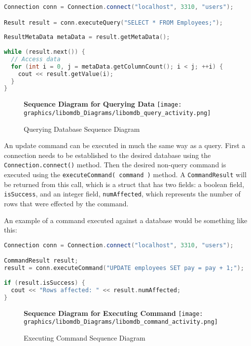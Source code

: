 \documentclass[letterpaper, 12pt]{article}
\renewcommand{\includegraphics}[2][]{\fbox{}}
\begin{document}
  \begin{lstlisting}[language=C++]
Connection conn = Connection.connect("localhost", 3310, "users"); 

Result result = conn.executeQuery("SELECT * FROM Employees;");
		
ResultMetaData metaData = result.getMetaData();	
	
while (result.next()) {
  // Access data
  for (int i = 0, j = metaData.getColumnCount(); i < j; ++i) {
    cout << result.getValue(i);	  	
  }
}
  \end{lstlisting}
  \par\vspace{\baselineskip}
  
  \begin{figure}
    \centering
    \textbf{Sequence Diagram for Querying Data}
    \texttt{[image: graphics/libomdb\_Diagrams/libomdb\_query\_activity.png]}
    \caption{Querying Database Sequence Diagram}
  \end{figure}
  \par\vspace{\baselineskip}
    
  An update command can be executed in much the same way as a query. First 
  a connection needs to be established to the desired database using the 
  \lstinline[basicstyle=\ttfamily]|Connection.connect()|
  method. Then the desired non-query command is executed using the 
  \lstinline[basicstyle=\ttfamily]|executeCommand( command )| method.
  A \lstinline[basicstyle=\ttfamily]|CommandResult| will be returned from this call,
  which is a struct that has two fields: a boolean field,
  \lstinline[basicstyle=\ttfamily]|isSuccess|, and an integer field,
  \lstinline[basicstyle=\ttfamily]|numAffected|, which represents the number of rows 
  that were effected by the command.
  \par\vspace{\baselineskip}
  An example of a command executed against a database would be something like this:
  \begin{lstlisting}[language=C++]
Connection conn = Connection.connect("localhost", 3310, "users");

CommandResult result;
result = conn.executeCommand("UPDATE employees SET pay = pay + 1;");
	
if (result.isSuccess) {
  cout << "Rows affected: " << result.numAffected;	
}
  \end{lstlisting}

  \begin{figure}
    \centering
    \textbf{Sequence Diagram for Executing Command}
    \texttt{[image: graphics/libomdb\_Diagrams/libomdb\_command\_activity.png]}
    \caption{Executing Command Sequence Diagram}
  \end{figure}    
  
\end{document}
